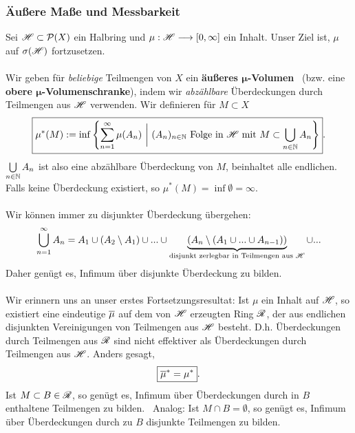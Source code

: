 \subsubsection{Äußere Maße und Messbarkeit}
Sei $\mathscr{H} \subset \mathcal{P}(X)$ ein Halbring und $\mu:\mathscr{H} \longrightarrow [0,\infty]$ ein Inhalt. Unser Ziel ist, $\mu$ auf $\sigma(\mathscr{H})$ fortzusetzen.\\\\
Wir geben für \emph{beliebige} Teilmengen von $X$ ein \textbf{äußeres $\boldsymbol\mu$-Volumen} \ (bzw. eine \textbf{obere $\boldsymbol\mu$-Volumenschranke}), indem wir \emph{abzählbare} Überdeckungen durch Teilmengen aus $\mathscr{H}$ verwenden. Wir definieren für $M \subset X$
$$
\boxed{\mu^*(M):= \inf \left\{ \sum_{n=1}^\infty \mu(A_n) \ \bigg\vert\ (A_n)_{n\in \mathbb{N}} \text{ Folge in $\mathscr{H}$ mit } M \subset {\bigcup_{n\in \mathbb{N}} A_n} \right\}}.
$$
$\bigcup\limits_{n\in\mathbb{N}} A_n$ ist also eine abzählbare Überdeckung von $M$, beinhaltet alle endlichen. Falls keine Überdeckung existiert, so $\mu^*(M)=\inf \emptyset = \infty$.
\\\\
Wir können immer zu disjunkter Überdeckung übergehen:
$$\bigcup_{n=1}^\infty A_n = A_1 \cup (A_2\setminus A_1) \cup ... \cup \underbrace{(A_n \setminus (A_1 \cup ... \cup A_{n-1}))}_{\text{disjunkt zerlegbar in Teilmengen aus }\mathscr{H}} \cup ...$$
Daher genügt es, Infimum über disjunkte Überdeckung zu bilden.\\\\
Wir erinnern uns an unser erstes Fortsetzungsresultat: Ist $\mu$ ein Inhalt auf $\mathscr{H}$, so existiert eine eindeutige $\overline{\mu}$ auf dem von $\mathscr{H}$ erzeugten Ring $\mathscr{R}$, der aus endlichen disjunkten Vereinigungen von Teilmengen aus $\mathscr{H}$ besteht. D.h. Überdeckungen durch Teilmengen aus $\mathscr{R}$ sind nicht effektiver als Überdeckungen durch Teilmengen aus $\mathscr{H}$. Anders gesagt,
$$\boxed{\overline\mu^* = \mu^*}.$$
Ist $M \subset B \in \mathscr{R}$, so genügt es, Infimum über Überdeckungen durch in $B$ enthaltene Teilmengen zu bilden. \Bild \ Analog: Ist $M\cap B = \emptyset$, so genügt es, Infimum über Überdeckungen durch zu $B$ disjunkte Teilmengen zu bilden.

